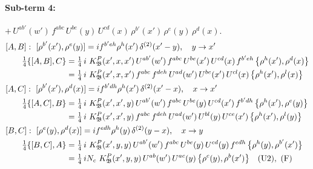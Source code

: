 \documentclass[10pt]{article}
\numberwithin{equation}{section}
\begin{document}
\paragraph{Sub-term 4:} $+\,U^{ab'}(w')\,f^{abc}\,U^{be}(y)\,U^{cd}(x)\,\rho^{b'}(x')\,\rho^{e}(y)\,\rho^{d}(x)$.
\begin{align}
&[A,B]:\ [\rho^{b'}(x'),\rho^{e}(y)]=i f^{b'eh}\rho^{h}(x')\,\delta^{(2)}(x'-y),\quad y\to x'\notag\\
&\qquad \tfrac14\{[A,B],C\}=\tfrac14\,i\,\,K^{P}_{\mathfrak B}(x',x,x')\,U^{ab'}(w')\,f^{abc}\,U^{be}(x')\,U^{cd}(x)\,f^{b'eh}\,\big\{\rho^{h}(x'),\rho^{d}(x)\big\}\notag\\
&\qquad\phantom{\tfrac14\{[A,B],C\}}=\tfrac14\,i\,\,K^{P}_{\mathfrak B}(x',x,x')\,f^{abc}\,f^{deh}\,U^{ad}(w')\,U^{be}(x')\,U^{cl}(x)\,\big\{\rho^{h}(x'),\rho^{l}(x)\big\}
\label{eq:GI.IV.P-4-AB}\\
&[A,C]:\ [\rho^{b'}(x'),\rho^{d}(x)]=i f^{b'dh}\rho^{h}(x')\,\delta^{(2)}(x'-x),\quad x\to x'\notag\\
&\qquad \tfrac14\{[A,C],B\}=\tfrac14\,i\,\,K^{P}_{\mathfrak B}(x',x',y)\,U^{ab'}(w')\,f^{abc}\,U^{be}(y)\,U^{cd}(x')\,f^{b'dh}\,\big\{\rho^{h}(x'),\rho^{e}(y)\big\}\notag\\
&\qquad\phantom{\tfrac14\{[A,C],B\}}=\tfrac14\,i\,\,K^{P}_{\mathfrak B}(x',x',y)\,f^{abc}\,f^{deh}\,U^{ad}(w')\,U^{bl}(y)\,U^{ce}(x')\,\big\{\rho^{h}(x'),\rho^{l}(y)\big\}
\label{eq:GI.IV.P-4-AC}\\
&[B,C]:\ [\rho^{e}(y),\rho^{d}(x)]=i f^{edh}\rho^{h}(y)\,\delta^{(2)}(y-x),\quad x\to y\notag\\
&\qquad \tfrac14\{[B,C],A\}=\tfrac14\,i\,\,K^{P}_{\mathfrak B}(x',y,y)\,U^{ab'}(w')\,f^{abc}\,U^{be}(y)\,U^{cd}(y)\,f^{edh}\,\big\{\rho^{h}(y),\rho^{b'}(x')\big\}\notag\\
&\qquad\phantom{\tfrac14\{[B,C],A\}}=\tfrac14\,i N_{c}\,\,K^{P}_{\mathfrak B}(x',y,y)\,U^{ab}(w')\,U^{ac}(y)\,\big\{\rho^{c}(y),\rho^{b}(x')\big\}\quad\text{(U2)},\ \text{(F)}
\label{eq:GI.IV.P-4-BC}
\end{align}
\end{document}
